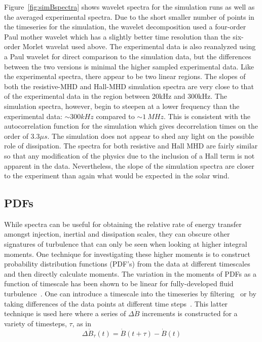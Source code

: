 \documentclass[12pt]{iopart}
\begin{document}
Figure~\ref{fig:simBspectra} shows wavelet spectra for the simulation runs as well as the averaged experimental spectra. Due to the short smaller number of points in the timeseries for the simulation, the wavelet decomposition used a four-order Paul mother wavelet  which has a slightly better time resolution than the six-order Morlet wavelat used above. The experimental data is also reanalyzed using a Paul wavelet for direct comparison to the simulation data, but the differences between the two versions is minimal the higher sampled experimental data. Like the experimental spectra, there appear to be two linear regions. The slopes of both the resistive-MHD and Hall-MHD simulation spectra are very close to that of the experimental data in the region between 20kHz and 300kHz. The simulation spectra, however, begin to steepen at a lower frequency than the experimental data: $\sim 300kHz$ compared to $\sim 1~MHz$. This is consistent with the autocorrelation function for the simulation which gives decorrelation times on the order of $3.3 \mu s$. The simulation does not appear to shed any light on the possible role of dissipation. The spectra for both resistive and Hall MHD are fairly similar so that any modification of the physics due to the inclusion of a Hall term is not apparent in the data. Nevertheless, the slope of the simulation spectra are closer to the experiment than again what would be expected in the solar wind.

\subsection{PDFs}

While spectra can be useful for obtaining the relative rate of energy transfer amongst injection, inertial and dissipation scales, they can obscure other signatures of turbulence that can only be seen when looking at higher integral moments. One technique for investigating these higher moments is to construct probability distribution functions (PDF's) from the data at different timescales and then directly calculate moments. The variation in the moments of PDFs as a function of timescale has been shown to be linear for fully-developed fluid turbulence~\cite{frisch95}. One can introduce a timescale into the timeseries by filtering~\cite{frisch95,wan12_apj} or by taking differences of the data points at different time steps~\cite{Greco08,Greco09}. This latter technique is used here where a series of $\Delta \dot{B}$ increments is constructed for a variety of timesteps, $\tau$, as in
\begin{equation}
\Delta \dot{B}_{\tau}(t) = \dot{B}(t+\tau)-\dot{B}(t)
\label{eq:increments}
\end{equation}
\end{document}
